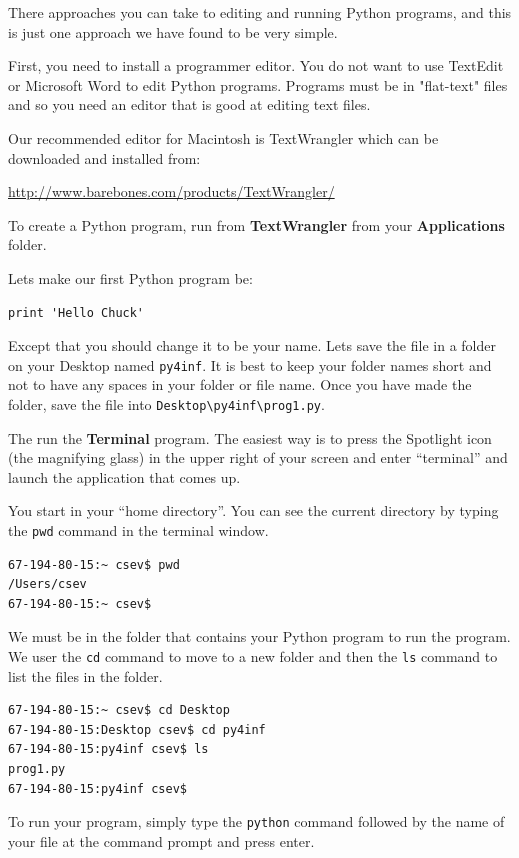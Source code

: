\documentclass[11pt]{book}
\begin{document}
There approaches you can take to editing and running
Python programs, and this is just one
approach we have found to be very simple.

First, you need to install a programmer editor.  You
do not want to use TextEdit or Microsoft Word to edit
Python programs.  Programs must be in "flat-text" files
and so you need an editor that is good at
editing text files.

Our recommended editor for Macintosh is TextWrangler which
can be downloaded and installed from:

\url{http://www.barebones.com/products/TextWrangler/}

To create a Python program, run from 
{\bf TextWrangler} from your {\bf Applications} folder.

Lets make our first Python program be:

\beforeverb
\begin{verbatim}
print 'Hello Chuck'
\end{verbatim}
\afterverb
%
Except that you should change it to be your name.  
Lets save the file in a folder on your Desktop named 
{\tt py4inf}.  It is best to keep your folder names short
and not to have any spaces in your folder or file name.
Once you have made the folder, save the file 
into {\tt Desktop{\textbackslash}py4inf{\textbackslash}prog1.py}.

The run the {\bf Terminal} program.  The easiest way is to 
press the Spotlight icon (the magnifying glass) in the upper
right of your screen and enter ``terminal'' and launch the
application that comes up.

You start in your ``home directory''.  You can see the current 
directory by typing the {\tt pwd} command in the terminal window.

\beforeverb
\begin{verbatim}
67-194-80-15:~ csev$ pwd
/Users/csev
67-194-80-15:~ csev$ 
\end{verbatim}
\afterverb
%
We must be in the folder that contains your Python program 
to run the program.  We user the {\tt cd} command to move to a new 
folder and then the {\tt ls} command to list the files in the 
folder.

\beforeverb
\begin{verbatim}
67-194-80-15:~ csev$ cd Desktop
67-194-80-15:Desktop csev$ cd py4inf
67-194-80-15:py4inf csev$ ls
prog1.py
67-194-80-15:py4inf csev$ 
\end{verbatim}
\afterverb
%
To run your program, simply type the {\tt python} command followed
by the name of your file at the 
command prompt and press enter.
\end{document}

